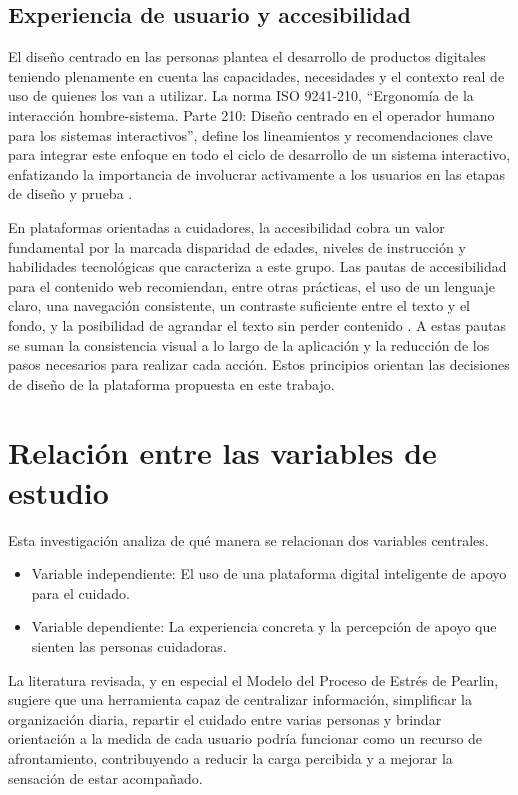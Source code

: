 \subsection{Experiencia de usuario y accesibilidad}

El diseño centrado en las personas plantea el desarrollo de productos digitales teniendo plenamente en cuenta las capacidades, necesidades y el contexto real de uso de quienes los van a utilizar. La norma ISO 9241-210, ``Ergonomía de la interacción hombre-sistema. Parte 210: Diseño centrado en el operador humano para los sistemas interactivos'', define los lineamientos y recomendaciones clave para integrar este enfoque en todo el ciclo de desarrollo de un sistema interactivo, enfatizando la importancia de involucrar activamente a los usuarios en las etapas de diseño y prueba \citep{une2019,ferreira2022}.

En plataformas orientadas a cuidadores, la accesibilidad cobra un valor fundamental por la marcada disparidad de edades, niveles de instrucción y habilidades tecnológicas que caracteriza a este grupo. Las pautas de accesibilidad para el contenido web recomiendan, entre otras prácticas, el uso de un lenguaje claro, una navegación consistente, un contraste suficiente entre el texto y el fondo, y la posibilidad de agrandar el texto sin perder contenido \citep{wcag22}. A estas pautas se suman la consistencia visual a lo largo de la aplicación y la reducción de los pasos necesarios para realizar cada acción. Estos principios orientan las decisiones de diseño de la plataforma propuesta en este trabajo.

\section{Relación entre las variables de estudio}

Esta investigación analiza de qué manera se relacionan dos variables centrales.

\begin{itemize}
    \item Variable independiente: El uso de una plataforma digital inteligente de apoyo para el cuidado.
    \item Variable dependiente: La experiencia concreta y la percepción de apoyo que sienten las personas cuidadoras.
\end{itemize}

La literatura revisada, y en especial el Modelo del Proceso de Estrés de Pearlin, sugiere que una herramienta capaz de centralizar información, simplificar la organización diaria, repartir el cuidado entre varias personas y brindar orientación a la medida de cada usuario podría funcionar como un recurso de afrontamiento, contribuyendo a reducir la carga percibida y a mejorar la sensación de estar acompañado.


